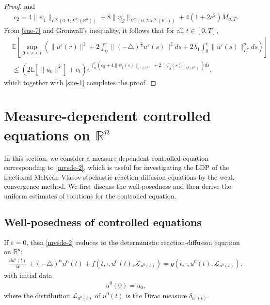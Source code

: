 \documentclass[11pt]{article}
\numberwithin{equation}{section}
\theoremstyle{plain}
\def\leq{\leqslant}
\begin{document}
\begin{proof}
and
 \begin{align*}
    c_2 =   4 \| \psi_1 \|_{L^\infty (0,T; L^\infty (\mathbb{R}^n) ) }
    + 8 \| \psi_g \|_{L^\infty (0,T; L^\infty (\mathbb{R}^n) ) }
    + 4(1+2c^2) M_{\sigma,T}.
\end{align*}
 From \eqref{sue-7} and Gronwall's inequality, it follows that
 for all $t\in [0, T]$,
\begin{align*}
        &  \mathbb{E} \left [ \sup_{0 \leq r\leq t}
    \left (\| u^\varepsilon(r) \|^2
    + 2 \int_0^r \| (-\triangle)^{\frac{\alpha}{2}} u^\varepsilon(s) \|^2 ds
    +2 \lambda_1 \int_0^r \| u^\varepsilon (s) \|^p_{L^p} ds
    \right )
    \right ] \nonumber \\
  & \leq
        \left( 2 \mathbb{E} \left[ \| u_0 \|^2 \right]
               + c_1
        \right)
         e^{   \int_0^t
          \left( c_2  + 4 \| \psi_1(s)
                         \|_{L^1
                        (\mathbb{R}^n)}
                +2 \| \psi_g(s) \|_{L^1(\mathbb{R}^n)
                    }
                         \right) ds
           },
\end{align*}
   which together with
   \eqref{sue-1}
   completes the proof.
\end{proof}


\section{Measure-dependent controlled   equations on $\mathbb{R}^n$  }

In this section, we consider a measure-dependent  controlled equation corresponding to \eqref{mvsde-2},
which is useful
for  investigating
the LDP of the
fractional McKean-Vlasov stochastic reaction-diffusion equations
by the  weak convergence method.
We first discuss the well-posedness
and then derive
the uniform estimates of solutions
for the controlled equation.





\subsection{Well-posedness of controlled equations}



 If  $\varepsilon = 0$,
 then \eqref{mvsde-2} reduces to  the deterministic reaction-diffusion equation on $\mathbb{R}^n$:
\begin{align}\label{dde}
     \frac{\partial u^0(t)}{\partial t}
      + (-\triangle)^\alpha u^0(t)
      + f(t, \cdot,  u^0(t), \mathcal{L}_{u^0(t)} )
    = g(t, \cdot, u^0(t), \mathcal{L}_{u^0(t)} ),
\end{align}
 with initial data
\begin{align} \label{dde IV}
    u^0(0) = u_0,
\end{align}
 where the distribution
 $\mathcal{L}_{u^0(t)}$
 of ${u^0(t)}$  is the Dirac measure
 $\delta_{u^0(t)}$.
\end{document}
